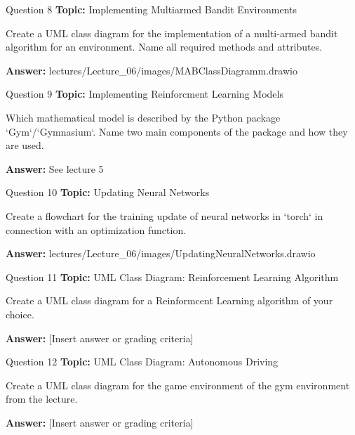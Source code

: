 \begin{frame}{Question 8}
    \textbf{Topic:} Implementing Multiarmed Bandit Environments
    \vspace{10pt}

    Create a UML class diagram for the implementation of a multi-armed bandit algorithm for an environment. Name all required methods and attributes. 
    \vspace{20pt}

    \textbf{Answer:} lectures/Lecture\_06/images/MABClassDiagramm.drawio
\end{frame}

\begin{frame}{Question 9}
    \textbf{Topic:} Implementing Reinforcment Learning Models
    \vspace{10pt}

    Which mathematical model is described by the Python package `Gym`/`Gymnasium`. Name two main components of the package and how they are used. 
    \vspace{20pt}

    \textbf{Answer:} See lecture 5
\end{frame}

\begin{frame}{Question 10}
    \textbf{Topic:} Updating Neural Networks
    \vspace{10pt}

    Create a flowchart for the training update of neural networks in `torch` in connection with an optimization function.
    \vspace{20pt}

    \textbf{Answer:} lectures/Lecture\_06/images/UpdatingNeuralNetworks.drawio
\end{frame}

\begin{frame}{Question 11}
    \textbf{Topic:} UML Class Diagram: Reinforcement Learning Algorithm
    \vspace{10pt}

    Create a UML class diagram for a Reinformcent Learning algorithm of your choice. 
    \vspace{20pt}

    \textbf{Answer:} [Insert answer or grading criteria]
\end{frame}

\begin{frame}{Question 12}
    \textbf{Topic:} UML Class Diagram: Autonomous Driving
    \vspace{10pt}

    Create a UML class diagram for the game environment of the gym environment from the lecture.
    \vspace{20pt}

    \textbf{Answer:} [Insert answer or grading criteria]
\end{frame}

